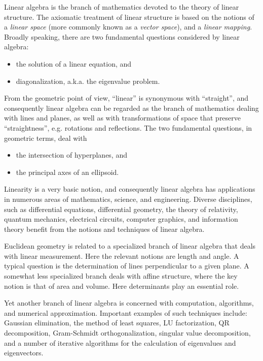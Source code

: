 \documentclass[12pt]{article}
\begin{document}
Linear algebra is the branch of mathematics devoted to the theory of
linear structure.  The axiomatic treatment of linear structure is
based on the notions of a {\em linear space} (more commonly known as a
{\em vector space}), and a {\em linear mapping}.  Broadly speaking,
there are two fundamental questions considered by linear algebra:
\begin{itemize}
\item the solution of a linear equation, and
\item diagonalization, a.k.a. the eigenvalue problem.
\end{itemize}
From the geometric point of view, ``linear'' is synonymous with
``straight'', and consequently linear algebra can be regarded as the
branch of mathematics dealing with lines and planes, as well as with
transformations of space that preserve ``straightness'', e.g.
rotations and reflections. The two fundamental questions, in geometric
terms, deal with
\begin{itemize}
\item the intersection of hyperplanes, and
\item the principal axes of an ellipsoid.
\end{itemize}

Linearity is a very basic notion, and consequently linear algebra has
applications in numerous areas of mathematics, science, and
engineering.  Diverse disciplines, such as differential equations,
differential geometry, the theory of relativity, quantum mechanics,
electrical circuits, computer graphics, and information theory benefit
from the notions and techniques of linear algebra.

Euclidean geometry is related to a specialized branch of linear
algebra that deals with linear measurement.  Here the relevant notions
are length and angle.  A typical question is the determination of
lines perpendicular to a given plane.  A somewhat less specialized
branch deals with affine structure, where the key notion is that of
area and volume. Here   determinants play an essential role.

Yet another branch of linear algebra is concerned with computation,
algorithms, and numerical approximation.  Important examples of such
techniques include: Gaussian elimination, the method of least squares,
LU factorization, QR decomposition, Gram-Schmidt orthogonalization,
singular value decomposition, and a number of iterative algorithms for
the calculation of eigenvalues and eigenvectors.
\end{document}
